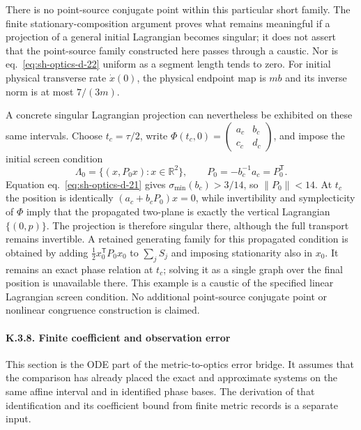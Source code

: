 \documentclass[
  english,
  11pt,
  reqno]{amsart}
\begin{document}
There is no point-source conjugate point within this particular short
family. The finite stationary-composition argument proves what remains
meaningful if a projection of a general initial Lagrangian becomes
singular; it does not assert that the point-source family constructed
here passes through a caustic. Nor is eq.~\ref{eq:sh-optics-d-22}
uniform as a segment length tends to zero. For initial physical
transverse rate \(\dot x(0)\), the physical endpoint map is \(m b\) and
its inverse norm is at most \(7/(3m)\).

A concrete singular Lagrangian projection can nevertheless be exhibited
on these same intervals. Choose \(t_c=\tau/2\), write
\(\Phi(t_c,0)=\begin{pmatrix}a_c&b_c\\c_c&d_c\end{pmatrix}\), and impose
the initial screen condition \[
 \Lambda_0=\{(x,P_0x):x\in\mathbb R^2\},\qquad
 P_0=-b_c^{-1}a_c=P_0^{\mathsf T}.
\] Equation eq.~\ref{eq:sh-optics-d-21} gives
\(\sigma_{\min}(b_c)>3/14\), so \(\|P_0\|<14\). At \(t_c\) the position
is identically \((a_c+b_cP_0)x=0\), while invertibility and
symplecticity of \(\Phi\) imply that the propagated two-plane is exactly
the vertical Lagrangian \(\{(0,p)\}\). The projection is therefore
singular there, although the full transport remains invertible. A
retained generating family for this propagated condition is obtained by
adding \(\tfrac12x_0^{\mathsf T}P_0x_0\) to \(\sum_jS_j\) and imposing
stationarity also in \(x_0\). It remains an exact phase relation at
\(t_c\); solving it as a single graph over the final position is
unavailable there. This example is a caustic of the specified linear
Lagrangian screen condition. No additional point-source conjugate point
or nonlinear congruence construction is claimed.

\protect{}\label{sec:sh-optics-8}

\paragraph{K.3.8. Finite coefficient and observation
error}\label{k.3.8.-finite-coefficient-and-observation-error}

This section is the ODE part of the metric-to-optics error bridge. It
assumes that the comparison has already placed the exact and approximate
systems on the same affine interval and in identified phase bases. The
derivation of that identification and its coefficient bound from finite
metric records is a separate input.
\end{document}
